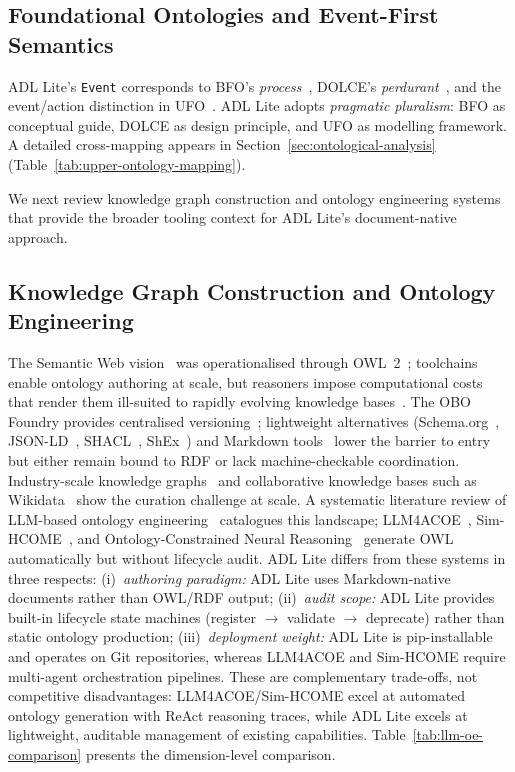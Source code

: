 \subsection{Foundational Ontologies and Event-First Semantics}\label{subsec:foundational-ontologies}

ADL Lite's \texttt{Event} corresponds to BFO's \emph{process}~\cite{bfo}, DOLCE's \emph{perdurant}~\cite{dolce}, and the event/action distinction in UFO~\cite{ufo}. ADL Lite adopts \emph{pragmatic pluralism}: BFO as conceptual guide, DOLCE as design principle, and UFO as modelling framework. A detailed cross-mapping appears in Section~\ref{sec:ontological-analysis} (Table~\ref{tab:upper-ontology-mapping}).\par
We next review knowledge graph construction and ontology engineering systems that provide the broader tooling context for ADL Lite's document-native approach.

\subsection{Knowledge Graph Construction and Ontology Engineering}\label{subsec:kg-ontology-engineering}

The Semantic Web vision~\cite{bernerslee2001semanticweb} was operationalised through OWL~2~\cite{owl2}; toolchains enable ontology authoring at scale, but reasoners impose computational costs that render them ill-suited to rapidly evolving knowledge bases~\cite{glimm2014hermit,sirin2007pellet,hogan2021knowledge}. The OBO Foundry provides centralised versioning~\cite{obo_foundry}; lightweight alternatives (Schema.org~\cite{guha2016schemaorg}, JSON-LD~\cite{json_ld}, SHACL~\cite{w3c_shacl}, ShEx~\cite{shex}) and Markdown tools~\cite{foam2020,dendron2020,obsidian2024} lower the barrier to entry but either remain bound to RDF or lack machine-checkable coordination. Industry-scale knowledge graphs~\cite{noy2019industrykg} and collaborative knowledge bases such as Wikidata~\cite{wikidata_vrandecic2014} show the curation challenge at scale. A systematic literature review of LLM-based ontology engineering~\cite{garijo2025llmoe} catalogues this landscape; LLM4ACOE~\cite{llm4acoe}, Sim-HCOME~\cite{sim_hcome}, and Ontology-Constrained Neural Reasoning~\cite{tuan2026ontology} generate OWL automatically but without lifecycle audit. ADL Lite differs from these systems in three respects: (i)~\emph{authoring paradigm:} ADL Lite uses Markdown-native documents rather than OWL/RDF output; (ii)~\emph{audit scope:} ADL Lite provides built-in lifecycle state machines (register $ \to $ validate $ \to $ deprecate) rather than static ontology production; (iii)~\emph{deployment weight:} ADL Lite is pip-installable and operates on Git repositories, whereas LLM4ACOE and Sim-HCOME require multi-agent orchestration pipelines. These are complementary trade-offs, not competitive disadvantages: LLM4ACOE/Sim-HCOME excel at automated ontology generation with ReAct reasoning traces, while ADL Lite excels at lightweight, auditable management of existing capabilities. Table~\ref{tab:llm-oe-comparison} presents the dimension-level comparison.

